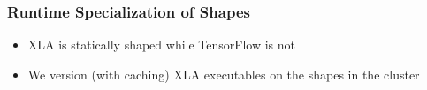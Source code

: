 \documentclass{beamer}
\newcommand{\image}[1]{\begin{figure}\fbox{\texttt{[image: ./images/\#1.pdf]}}\end{figure}}
\begin{document}



\begin{frame}[fragile]
  \frametitle{Runtime Specialization of Shapes}


  \begin{itemize}
    \item XLA is statically shaped while TensorFlow is not
    \item We version (with caching) XLA executables on the shapes in the cluster
  \end{itemize}
\end{frame}
\end{document}

